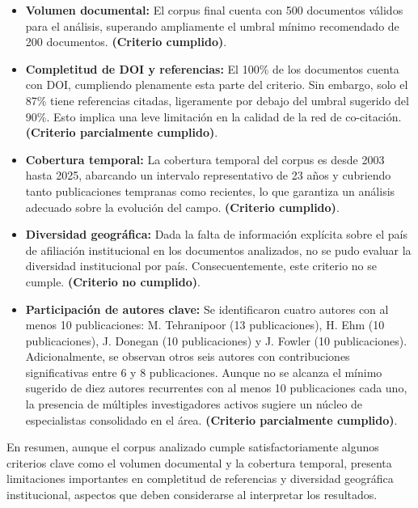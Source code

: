 \documentclass[twoside, twocolumn]{article}
\newcommand{\1}{\mathds{1}}						%
\begin{document}
\begin{itemize}
    \item \textbf{Volumen documental:}
    El corpus final cuenta con 500 documentos válidos para el análisis, superando ampliamente el umbral mínimo recomendado de 200 documentos. \textbf{(Criterio cumplido)}.

    \item \textbf{Completitud de DOI y referencias:}
    El 100\% de los documentos cuenta con DOI, cumpliendo plenamente esta parte del criterio. Sin embargo, solo el 87\% tiene referencias citadas, ligeramente por debajo del umbral sugerido del 90\%. Esto implica una leve limitación en la calidad de la red de co-citación. \textbf{(Criterio parcialmente cumplido)}.

    \item \textbf{Cobertura temporal:}
    La cobertura temporal del corpus es desde 2003 hasta 2025, abarcando un intervalo representativo de 23 años y cubriendo tanto publicaciones tempranas como recientes, lo que garantiza un análisis adecuado sobre la evolución del campo. \textbf{(Criterio cumplido)}.

    \item \textbf{Diversidad geográfica:}
    Dada la falta de información explícita sobre el país de afiliación institucional en los documentos analizados, no se pudo evaluar la diversidad institucional por país. Consecuentemente, este criterio no se cumple. \textbf{(Criterio no cumplido)}.

    \item \textbf{Participación de autores clave:}
Se identificaron cuatro autores con al menos 10 publicaciones: M. Tehranipoor (13 publicaciones), H. Ehm (10 publicaciones), J. Donegan (10 publicaciones) y J. Fowler (10 publicaciones). Adicionalmente, se observan otros seis autores con contribuciones significativas entre 6 y 8 publicaciones. Aunque no se alcanza el mínimo sugerido de diez autores recurrentes con al menos 10 publicaciones cada uno, la presencia de múltiples investigadores activos sugiere un núcleo de especialistas consolidado en el área. \textbf{(Criterio parcialmente cumplido)}.
\end{itemize}

En resumen, aunque el corpus analizado cumple satisfactoriamente algunos criterios clave como el volumen documental y la cobertura temporal, presenta limitaciones importantes en completitud de referencias y diversidad geográfica institucional, aspectos que deben considerarse al interpretar los resultados.
\end{document}
